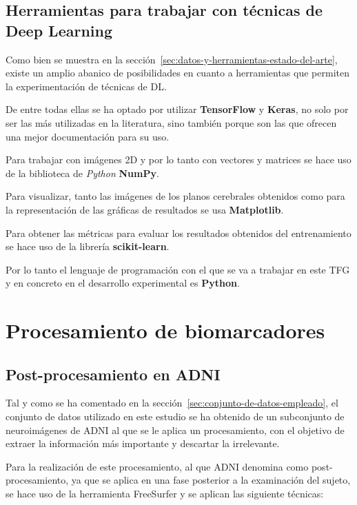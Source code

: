 \subsection{Herramientas para trabajar con técnicas de Deep Learning}
\label{subsec:herramientas-para-trabajar-con-tecnicas-de-deep-learning}
Como bien se muestra en la sección~\ref{sec:datos-y-herramientas-estado-del-arte}, existe un amplio abanico de
posibilidades en cuanto a herramientas que permiten la experimentación de técnicas de DL.

De entre todas ellas se ha optado por utilizar \textbf{TensorFlow} y \textbf{Keras}, no solo por ser las más utilizadas
en la literatura, sino también porque son las que ofrecen una mejor documentación para su uso.

Para trabajar con imágenes 2D y por lo tanto con vectores y matrices se hace uso de la biblioteca de \textit{Python}
\textbf{NumPy}.

Para visualizar, tanto las imágenes de los planos cerebrales obtenidos como para la representación de las gráficas de
resultados se usa \textbf{Matplotlib}.

Para obtener las métricas para evaluar los resultados obtenidos del entrenamiento se hace uso de la librería
\textbf{scikit-learn}.

Por lo tanto el lenguaje de programación con el que se va a trabajar en este TFG y en concreto en el desarrollo
experimental es \textbf{Python}.

\section{Procesamiento de biomarcadores}\label{sec:procesamiento-de-biomarcadores}

\subsection{Post-procesamiento en ADNI}\label{subsec:post-procesamiento-en-adni}
Tal y como se ha comentado en la sección~\ref{sec:conjunto-de-datos-empleado}, el conjunto de datos utilizado en este estudio se
ha obtenido de un subconjunto de neuroimágenes de ADNI al que se le aplica un procesamiento, con el objetivo de extraer
la información más importante y descartar la irrelevante.

Para la realización de este procesamiento, al que ADNI denomina como post-procesamiento, ya que se aplica en una fase
posterior a la examinación del sujeto, se hace uso de la herramienta FreeSurfer y  se aplican las siguiente técnicas:

